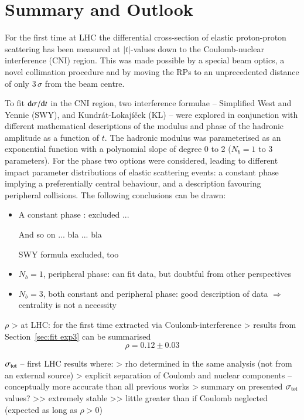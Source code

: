 \section{Summary and Outlook}
\label{sec:summary}
For the first time at LHC the differential cross-section of elastic proton-proton scattering has been measured at $|t|$-values down to the Coulomb-nuclear interference (CNI) region. This was made possible by a special beam optics, a novel collimation procedure and by moving the RPs to an unprecedented distance of only 
$3\,\sigma$ from the beam centre.

To fit ${\rm d}\sigma/{\rm d} t$ in the CNI region, two interference formulae --
Simplified West and Yennie (SWY), and Kundr\' at-Lokaj\' i\v cek (KL) -- 
were explored in 
conjunction with different mathematical descriptions of the modulus and phase 
of the hadronic amplitude as a function of $t$. The hadronic modulus was parameterised as an exponential function with a polynomial slope of degree 0 to 2 ($N_b=1$ to 3 parameters).
For the phase two options were considered, leading to different impact 
parameter distributions of elastic scattering events: a constant phase implying a preferentially central behaviour, and a description favouring peripheral collisions.
The following conclusions can be drawn:
\begin{itemize}
\item A constant phase : excluded ...

And so on ... bla ... bla 

SWY formula excluded, too
\item $N_b=1$, peripheral phase: can fit data, but doubtful from other perspectives
\item $N_b=3$, both constant and peripheral phase: good description of data $\Rightarrow$ centrality is not a necessity
\end{itemize}

\> $\rho$
\>> at LHC: for the first time extracted via Coulomb-interference
\>> results from Section~\ref{sec:fit exp3} can be summarised
\begin{equation}
\label{eq:rho final}
\rho = 0.12 \pm 0.03
\end{equation}

\> $\sigma_{\rm tot}$ -- first LHC results where:
\>> rho determined in the same analysis (not from an external source)
\>> explicit separation of Coulomb and nuclear components -- conceptually more accurate than all previous works
\>> summary on presented $\sigma_{\rm tot}$ values?
\>>> extremely stable
\>>> little greater than if Coulomb neglected (expected as long as $\rho > 0$)

